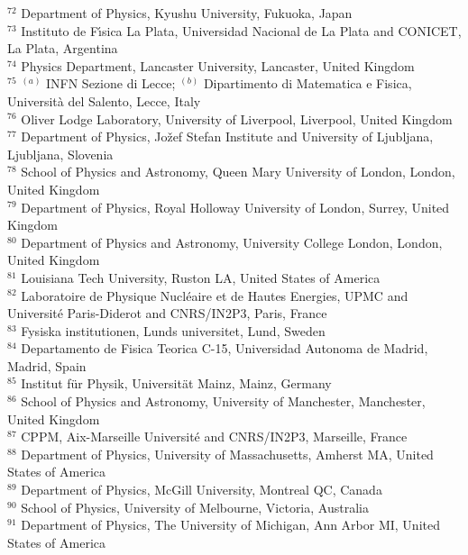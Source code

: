 \begin{flushleft}
$^{72}$ Department of Physics, Kyushu University, Fukuoka, Japan\\
$^{73}$ Instituto de F{\'\i}sica La Plata, Universidad Nacional de La Plata and CONICET, La Plata, Argentina\\
$^{74}$ Physics Department, Lancaster University, Lancaster, United Kingdom\\
$^{75}$ $^{(a)}$ INFN Sezione di Lecce; $^{(b)}$ Dipartimento di Matematica e Fisica, Universit{\`a} del Salento, Lecce, Italy\\
$^{76}$ Oliver Lodge Laboratory, University of Liverpool, Liverpool, United Kingdom\\
$^{77}$ Department of Physics, Jo{\v{z}}ef Stefan Institute and University of Ljubljana, Ljubljana, Slovenia\\
$^{78}$ School of Physics and Astronomy, Queen Mary University of London, London, United Kingdom\\
$^{79}$ Department of Physics, Royal Holloway University of London, Surrey, United Kingdom\\
$^{80}$ Department of Physics and Astronomy, University College London, London, United Kingdom\\
$^{81}$ Louisiana Tech University, Ruston LA, United States of America\\
$^{82}$ Laboratoire de Physique Nucl{\'e}aire et de Hautes Energies, UPMC and Universit{\'e} Paris-Diderot and CNRS/IN2P3, Paris, France\\
$^{83}$ Fysiska institutionen, Lunds universitet, Lund, Sweden\\
$^{84}$ Departamento de Fisica Teorica C-15, Universidad Autonoma de Madrid, Madrid, Spain\\
$^{85}$ Institut f{\"u}r Physik, Universit{\"a}t Mainz, Mainz, Germany\\
$^{86}$ School of Physics and Astronomy, University of Manchester, Manchester, United Kingdom\\
$^{87}$ CPPM, Aix-Marseille Universit{\'e} and CNRS/IN2P3, Marseille, France\\
$^{88}$ Department of Physics, University of Massachusetts, Amherst MA, United States of America\\
$^{89}$ Department of Physics, McGill University, Montreal QC, Canada\\
$^{90}$ School of Physics, University of Melbourne, Victoria, Australia\\
$^{91}$ Department of Physics, The University of Michigan, Ann Arbor MI, United States of America\\

\end{flushleft}
